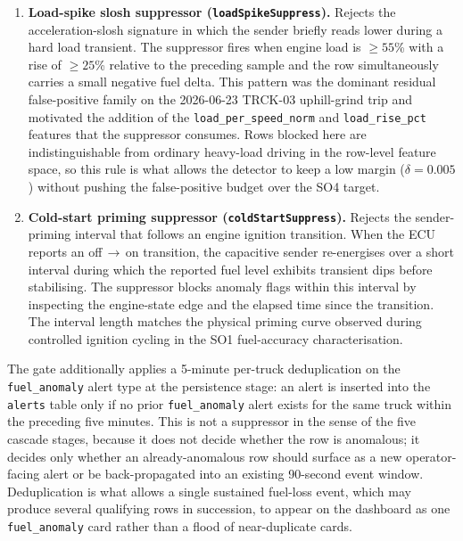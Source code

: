 \begin{enumerate}[label=\textbf{(\alph*)}, leftmargin=*]
    \item \textbf{Load-spike slosh suppressor (\texttt{loadSpikeSuppress}).} Rejects the acceleration-slosh signature in which the sender briefly reads lower during a hard load transient. The suppressor fires when engine load is $\geq 55$\% with a rise of $\geq 25$\% relative to the preceding sample and the row simultaneously carries a small negative fuel delta. This pattern was the dominant residual false-positive family on the 2026-06-23 TRCK-03 uphill-grind trip and motivated the addition of the \texttt{load\_per\_speed\_norm} and \texttt{load\_rise\_pct} features that the suppressor consumes. Rows blocked here are indistinguishable from ordinary heavy-load driving in the row-level feature space, so this rule is what allows the detector to keep a low margin ($\delta = 0.005$) without pushing the false-positive budget over the SO4 target.

    \item \textbf{Cold-start priming suppressor (\texttt{coldStartSuppress}).} Rejects the sender-priming interval that follows an engine ignition transition. When the ECU reports an off\,$\rightarrow$\,on transition, the capacitive sender re-energises over a short interval during which the reported fuel level exhibits transient dips before stabilising. The suppressor blocks anomaly flags within this interval by inspecting the engine-state edge and the elapsed time since the transition. The interval length matches the physical priming curve observed during controlled ignition cycling in the SO1 fuel-accuracy characterisation.
\end{enumerate}

The gate additionally applies a 5-minute per-truck deduplication on the \texttt{fuel\_anomaly} alert type at the persistence stage: an alert is inserted into the \texttt{alerts} table only if no prior \texttt{fuel\_anomaly} alert exists for the same truck within the preceding five minutes. This is not a suppressor in the sense of the five cascade stages, because it does not decide whether the row is anomalous; it decides only whether an already-anomalous row should surface as a new operator-facing alert or be back-propagated into an existing 90-second event window. Deduplication is what allows a single sustained fuel-loss event, which may produce several qualifying rows in succession, to appear on the dashboard as one \texttt{fuel\_anomaly} card rather than a flood of near-duplicate cards.

